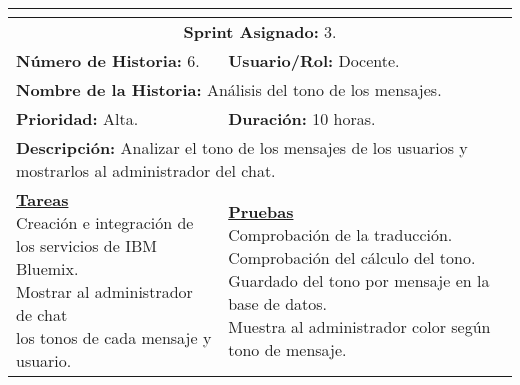 \resizebox{15cm}{!} {
	\begin{tabular}{|l|l|}
		\hline
		\multicolumn{2}{|c|}{\cellcolor[HTML]{343434}{\color[HTML]{FFFFFF} \textbf{Historia de Usuario}}} \\
		\hline
		\multicolumn{2}{|c|}{\textbf{Sprint Asignado:} 3.} \\
		\hline
		\textbf{Número de Historia:} 6. & \textbf{Usuario/Rol:} Docente.\\
		\hline
		\multicolumn{2}{|l|}{\textbf{Nombre de la Historia:} Análisis del tono de los mensajes.} \\
		\hline
		\textbf{Prioridad:} Alta. & \textbf{Duración:} 10 horas.\\
		\hline
		\multicolumn{2}{|l|}{\textbf{Descripción:} Analizar el tono de los mensajes de los usuarios y mostrarlos al administrador del chat.} \\
		\hline
		\specialcell{\underline{\textbf{Tareas}} \\ Creación e integración de \\ los servicios de IBM Bluemix. \\ Mostrar al administrador de chat \\ los tonos de cada mensaje y usuario.} & \specialcell{\underline{\textbf{Pruebas}} \\ Comprobación de la traducción. \\ Comprobación del cálculo del tono. \\ Guardado del tono por mensaje en la base de datos. \\ Muestra al administrador color según tono de mensaje.} \\
		\hline
	\end{tabular}
}
